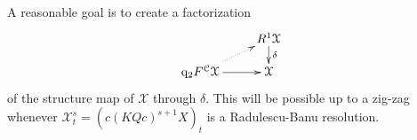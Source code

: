 \documentclass[11pt]{amsart} \renewcommand{\baselinestretch}{1.2}
\theoremstyle{plain}
\theoremstyle{definition}
\renewcommand{\to}{\longrightarrow}
\newcommand{\from}{\longleftarrow}
\newcommand{\frakt}{\mathfrak{t}}
\newcommand{\fraks}{\mathfrak{s}}
\newcommand{\calx}{\mathcal{X}}
\newcommand{\calc}{\mathcal{C}}
\newcommand{\quadgrad}[1]{\mathrm{q}_{#1}}
\newcommand{\Dendo}{R}
\begin{document}
\begin{Operations on the Bousfield-Kan spectral sequence}
A reasonable goal is to create a factorization
\[\xymatrix@R=4mm{
&%
\Dendo^1\calx\ar[d]^-{\delta}
\\%
\quadgrad{2}F^{\calc}\calx\ar@{..>}[ur]
\ar[r]
&%
\calx%
}\]
of the structure map of $\calx$ through $\delta$. This will be possible up to a zig-zag whenever $\calx^s_t=(c(KQc)^{s+1}X)_t$ is a  Radulescu-Banu resolution. 
%
%
%
%





\end{Operations on the Bousfield-Kan spectral sequence}
\end{document}
